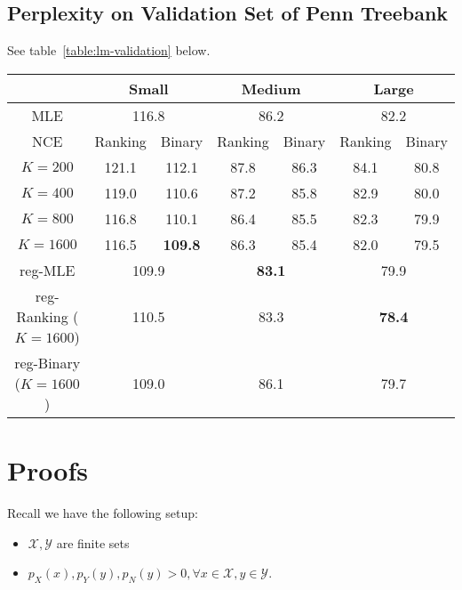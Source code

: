 \documentclass[11pt,a4paper]{article}
\begin{document}
\subsection{Perplexity on Validation Set of Penn Treebank}
\label{sec:exp-validation}
See table~\ref{table:lm-validation} below.
\begin{table*}[t!]
\centering
\begin{tabular}{|c|c|c|c|c|c|c|}
\hline
&   \multicolumn{2}{|c|}{Small}  &  \multicolumn{2}{|c|}{Medium}  &  \multicolumn{2}{|c|}{Large} \\
\hline
MLE
  &  \multicolumn{2}{|c|}{116.8} & \multicolumn{2}{|c|}{86.2}   & \multicolumn{2}{|c|}{82.2}\\
  \hline
 NCE   &Ranking &Binary     &Ranking &Binary   &Ranking &Binary   \\
 \hline
$K = 200$   & 121.1 & 112.1     & 87.8  & 86.3    & 84.1  &80.8   \\
\hline
$K = 400$   & 119.0 & 110.6     & 87.2  & 85.8    & 82.9  &80.0   \\
\hline
$K = 800$   & 116.8 & 110.1     & 86.4  & 85.5    & 82.3  &79.9   \\
\hline
$K = 1600$  & 116.5 & \textbf{109.8} & 86.3  & 85.4   & 82.0  &79.5   \\
\hline
reg-MLE      & \multicolumn{2}{|c|}{109.9}   &\multicolumn{2}{|c|}{\textbf{83.1}}     & \multicolumn{2}{|c|}{79.9} \\
\hline
reg-Ranking ($K = 1600$)  & \multicolumn{2}{|c|}{110.5}   &\multicolumn{2}{|c|}{83.3}     & \multicolumn{2}{|c|}{\textbf{78.4}} \\
\hline
reg-Binary ($K = 1600$)  & \multicolumn{2}{|c|}{109.0}  &\multicolumn{2}{|c|}{86.1}     & \multicolumn{2}{|c|}{79.7} \\
\hline
\end{tabular}
\caption{Perplexity on the validation set. We show performance for
the Ranking vs. Binary loss algorithms, with different values for $K$,
and with/without regularization.}
\label{table:lm-validation}
\end{table*}



\section{Proofs}
\label{sec:supplemental}
Recall we have the following setup: 
\begin{itemize}
  \item $\mathcal{X}, \mathcal{Y}$ are finite sets
  \item $p_X(x), p_Y(y), p_N(y) > 0, \forall x\in\mathcal{X}, y\in\mathcal{Y}$.
\end{itemize}
\end{document}
